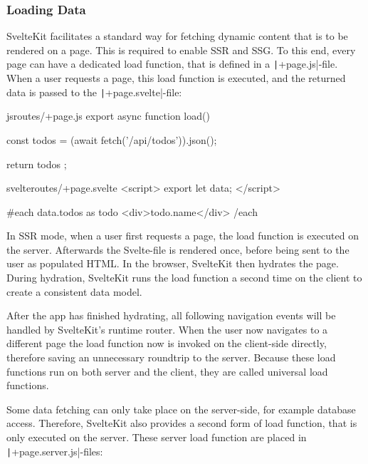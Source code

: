 \subsubsection{Loading Data}
\label{sec:sveltekit-loading}

SvelteKit facilitates a standard way for fetching dynamic content that is to be rendered on a page. This is required to enable SSR and SSG. To this end, every page can have a dedicated load function, that is defined in a \texttt|+page.js|-file. When a user requests a page, this load function is executed, and the returned data is passed to the \texttt|+page.svelte|-file:

\begin{myminted}{js}{routes/+page.js}
export async function load() {
    const todos = (await fetch('/api/todos')).json();

    return { todos };
}
\end{myminted}
\begin{myminted}{svelte}{routes/+page.svelte}
<script>
    export let data;
</script>

{#each data.todos as todo}
    <div>{todo.name}</div>
{/each}
\end{myminted} 

In SSR mode, when a user first requests a page, the load function is executed on the server. Afterwards the Svelte-file is rendered once, before being sent to the user as populated HTML. In the browser, SvelteKit then hydrates the page. During hydration, SvelteKit runs the load function a second time on the client to create a consistent data model. 

After the app has finished hydrating, all following navigation events will be handled by SvelteKit's runtime router. When the user now navigates to a different page the load function now is invoked on the client-side directly, therefore saving an unnecessary roundtrip to the server. Because these load functions run on both server and the client, they are called universal load functions.

Some data fetching can only take place on the server-side, for example database access. Therefore, SvelteKit also provides a second form of load function, that is only executed on the server. These server load function are placed in \texttt|+page.server.js|-files:

\s{$}

